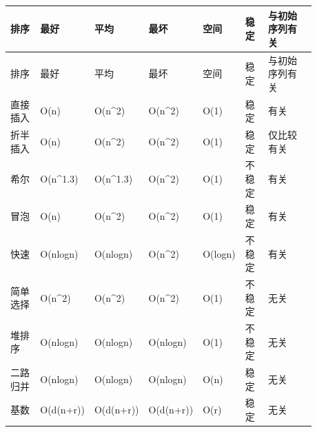 \documentclass[10pt,a4paper]{ctexart}
\begin{document}
\begin{center}\small
\begin{longtable}{@{}>{\raggedright\arraybackslash}p{0.113\linewidth}>{\raggedright\arraybackslash}p{0.127\linewidth}>{\raggedright\arraybackslash}p{0.127\linewidth}>{\raggedright\arraybackslash}p{0.127\linewidth}>{\raggedright\arraybackslash}p{0.099\linewidth}>{\raggedright\arraybackslash}p{0.085\linewidth}>{\raggedright\arraybackslash}p{0.197\linewidth}@{}}
\toprule
排序 & 最好 & 平均 & 最坏 & 空间 & 稳定 & 与初始序列有关 \\
\midrule
\endfirsthead
\toprule
排序 & 最好 & 平均 & 最坏 & 空间 & 稳定 & 与初始序列有关 \\
\midrule
\endhead
\bottomrule
\endlastfoot
直接插入 & O(n) & O(n\textasciicircum{}2) & O(n\textasciicircum{}2) & O(1) & 稳定 & 有关 \\
折半插入 & O(n) & O(n\textasciicircum{}2) & O(n\textasciicircum{}2) & O(1) & 稳定 & 仅比较有关 \\
希尔 & O(n\textasciicircum{}1.3) & O(n\textasciicircum{}1.3) & O(n\textasciicircum{}2) & O(1) & 不稳定 & 有关 \\
冒泡 & O(n) & O(n\textasciicircum{}2) & O(n\textasciicircum{}2) & O(1) & 稳定 & 有关 \\
快速 & O(nlogn) & O(nlogn) & O(n\textasciicircum{}2) & O(logn) & 不稳定 & 有关 \\
简单选择 & O(n\textasciicircum{}2) & O(n\textasciicircum{}2) & O(n\textasciicircum{}2) & O(1) & 不稳定 & 无关 \\
堆排序 & O(nlogn) & O(nlogn) & O(nlogn) & O(1) & 不稳定 & 无关 \\
二路归并 & O(nlogn) & O(nlogn) & O(nlogn) & O(n) & 稳定 & 无关 \\
基数 & O(d(n+r)) & O(d(n+r)) & O(d(n+r)) & O(r) & 稳定 & 无关 \\
\end{longtable}
\end{center}




\end{document}
